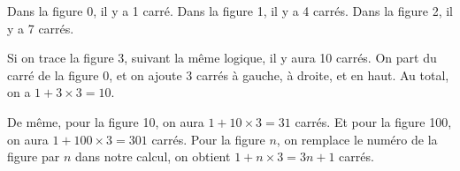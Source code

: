 \documentclass[../Cours.tex]{subfiles}
\begin{document}
\begin{questions}
    Dans la figure 0, il y a 1 carré.
    Dans la figure 1, il y a 4 carrés.
    Dans la figure 2, il y a 7 carrés.

    Si on trace la figure 3, suivant la même logique, il y aura 10 carrés. On part du carré de la figure 0, et on ajoute 3 carrés à gauche, à droite, et en haut. Au total, on a $1 + 3 \times 3 = 10$.

    De même, pour la figure 10, on aura $1 + 10 \times 3 = 31$ carrés.
    Et pour la figure 100, on aura $1 + 100 \times 3 = 301$ carrés.
    Pour la figure $n$, on remplace le numéro de la figure par $n$ dans notre calcul, on obtient $1 + n \times 3 = 3n + 1$ carrés.

    
\end{questions}
\end{document}
